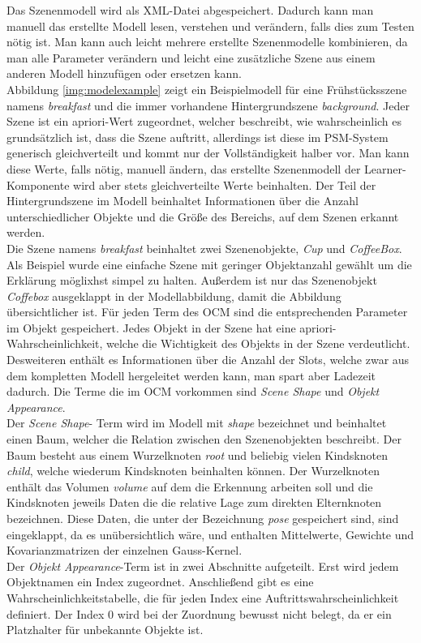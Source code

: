 Das Szenenmodell wird als XML-Datei abgespeichert. Dadurch kann man manuell das erstellte Modell lesen, verstehen und verändern, falls dies zum Testen nötig ist. Man kann auch leicht mehrere erstellte Szenenmodelle kombinieren, da man alle Parameter verändern und leicht eine zusätzliche Szene aus einem anderen Modell hinzufügen oder ersetzen kann. \cite{hosc99}\smallskip\\ 
Abbildung \ref{img:modelexample} zeigt ein Beispielmodell für eine Frühstücksszene namens \textit{breakfast} und die immer vorhandene Hintergrundszene \textit{background}. Jeder Szene ist ein apriori-Wert zugeordnet, welcher beschreibt, wie wahrscheinlich es grundsätzlich ist, dass die Szene auftritt, allerdings ist diese im PSM-System generisch gleichverteilt und kommt nur der Vollständigkeit halber vor. Man kann diese Werte, falls nötig, manuell ändern, das erstellte Szenenmodell der Learner-Komponente wird aber stets gleichverteilte Werte beinhalten. Der Teil der Hintergrundszene im Modell beinhaltet Informationen über die Anzahl unterschiedlicher Objekte und die Größe des Bereichs, auf dem Szenen erkannt werden.\smallskip\\
Die Szene namens \textit{breakfast} beinhaltet zwei Szenenobjekte, \textit{Cup} und \textit{CoffeeBox}. Als Beispiel wurde eine einfache Szene mit geringer Objektanzahl gewählt um die Erklärung möglixhst simpel zu halten. Außerdem ist nur das Szenenobjekt \textit{Coffebox} ausgeklappt in der Modellabbildung, damit die Abbildung übersichtlicher ist. Für jeden Term des OCM sind die entsprechenden Parameter im Objekt gespeichert. Jedes Objekt in der Szene hat eine apriori-Wahrscheinlichkeit, welche die Wichtigkeit des Objekts in der Szene verdeutlicht. Desweiteren enthält es Informationen über die Anzahl der Slots, welche zwar aus dem kompletten Modell hergeleitet werden kann, man spart aber Ladezeit dadurch. Die Terme die im OCM vorkommen sind \textit{Scene Shape} und \textit{Objekt Appearance}.\smallskip\\
Der \textit{Scene Shape}- Term wird im Modell mit \textit{shape} bezeichnet und beinhaltet einen Baum, welcher die Relation zwischen den Szenenobjekten beschreibt. Der Baum besteht aus einem Wurzelknoten \textit{root} und beliebig vielen Kindsknoten \textit{child}, welche wiederum Kindsknoten beinhalten können. Der Wurzelknoten enthält das Volumen \textit{volume} auf dem die Erkennung arbeiten soll und die Kindsknoten jeweils Daten die die relative Lage zum direkten Elternknoten bezeichnen. Diese Daten, die unter der Bezeichnung \textit{pose} gespeichert sind, sind eingeklappt, da es unübersichtlich wäre, und enthalten Mittelwerte, Gewichte und Kovarianzmatrizen der einzelnen Gauss-Kernel.\smallskip\\
Der \textit{Objekt Appearance}-Term ist in zwei Abschnitte aufgeteilt. Erst wird jedem Objektnamen ein Index zugeordnet. Anschließend gibt es eine Wahrscheinlichkeitstabelle, die für jeden Index eine Auftrittswahrscheinlichkeit definiert. Der Index 0 wird bei der Zuordnung bewusst nicht belegt, da er ein Platzhalter für unbekannte Objekte ist.
\cite{gehrung14}

